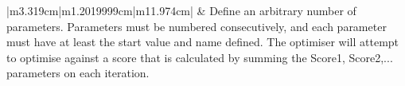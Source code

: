 \begin{center}
\begin{supertabular}{|m{3.319cm}|m{1.2019999cm}|m{11.974cm}|}
 &
Define an arbitrary number of parameters. Parameters must be numbered consecutively, and each parameter must have at
least the start value and name defined. The optimiser will attempt to optimise against a score that is calculated by summing the Score1, Score2,... parameters
on each iteration.\\\hline
\end{supertabular}
\end{center}
